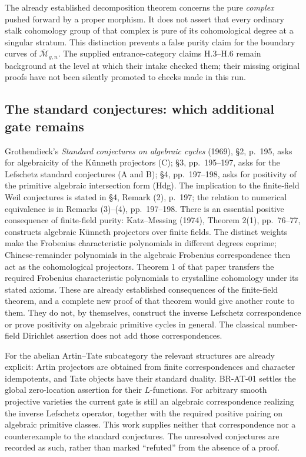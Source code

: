 \documentclass[11pt,a4paper]{article}
\theoremstyle{definition}\newtheorem{definition}[theorem]{Definition}
\theoremstyle{remark}\newtheorem{remark}[theorem]{Remark}
\begin{document}
The already established decomposition theorem concerns the pure
\emph{complex} pushed forward by a proper morphism.  It does not
assert that every ordinary stalk cohomology group of that complex
is pure of its cohomological degree at a singular stratum.  This
distinction prevents a false purity claim for the boundary curves
of $\overline{\mathcal M}_{g,n}$.  The supplied entrance-category
claims H.3--H.6 remain background at the level at which their intake
checked them; their missing original proofs have not been silently
promoted to checks made in this run.

\subsection{The standard conjectures: which additional gate remains}

Grothendieck's \emph{Standard conjectures on algebraic cycles}
(1969), \S2, p.~195, asks for algebraicity of the K\"unneth
projectors (C); \S3, pp.~195--197, asks for the Lefschetz
standard conjectures (A and B); \S4, pp.~197--198, asks for
positivity of the primitive algebraic intersection form (Hdg).
The implication to the finite-field Weil conjectures is stated in
\S4, Remark (2), p.~197; the relation to numerical equivalence
is in Remarks (3)--(4), pp.~197--198.
There is an essential positive consequence of finite-field purity:
Katz--Messing (1974), Theorem 2(1), pp.~76--77, constructs algebraic
K\"unneth projectors over finite fields.  The distinct weights make the
Frobenius characteristic polynomials in different degrees coprime;
Chinese-remainder polynomials in the algebraic Frobenius correspondence
then act as the cohomological projectors.  Theorem 1 of that paper
transfers the required Frobenius characteristic polynomials to crystalline
cohomology under its stated axioms.  These are already established
consequences of the finite-field theorem, and a complete new proof of
that theorem would give another route to them.  They do not, by
themselves, construct the inverse Lefschetz correspondence or prove
positivity on algebraic primitive cycles in general.  The classical
number-field Dirichlet assertion does not add those correspondences.

For the abelian Artin--Tate subcategory the relevant structures are
already explicit: Artin projectors are obtained from finite
correspondences and character idempotents, and Tate objects have
their standard duality.  BR-AT-01 settles the global zero-location
assertion for their $L$-functions.  For arbitrary smooth projective
varieties the current gate is still an algebraic correspondence
realizing the inverse Lefschetz operator, together with the
required positive pairing on algebraic primitive classes.  This
work supplies neither that correspondence nor a counterexample to
the standard conjectures.  The unresolved conjectures are recorded
as such, rather than marked ``refuted'' from the absence of a proof.
\end{document}
